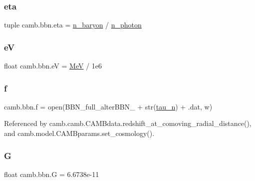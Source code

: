 \mbox{\label{namespacecamb_1_1bbn_acbc137606c793f20e1ded220bbfab367}} 
\subsubsection{\texorpdfstring{eta}{eta}}
{\footnotesize\ttfamily tuple camb.\+bbn.\+eta = \mbox{\hyperlink{namespacecamb_1_1bbn_a6c667fa779cc99916a01199319f7757f}{n\+\_\+baryon}} / \mbox{\hyperlink{namespacecamb_1_1bbn_aa1b409ea1a7b5f583772b3f5cc174be0}{n\+\_\+photon}}}

\mbox{\label{namespacecamb_1_1bbn_adb3c70534be507b9680c975ad6c2ada1}} 
\subsubsection{\texorpdfstring{eV}{eV}}
{\footnotesize\ttfamily float camb.\+bbn.\+eV = \mbox{\hyperlink{namespacecamb_1_1bbn_ab7d9516327d53209dc68ed04b575b942}{MeV}} / 1e6}

\mbox{\label{namespacecamb_1_1bbn_afa8615e8e051ca1f43e59371e94d4920}} 
\subsubsection{\texorpdfstring{f}{f}}
{\footnotesize\ttfamily camb.\+bbn.\+f = open(\textquotesingle{}B\+B\+N\+\_\+full\+\_\+alter\+B\+B\+N\+\_\+\textquotesingle{} + str(\mbox{\hyperlink{namespacecamb_1_1bbn_ae95abe1177100ca3b8cfb59cf9e379be}{tau\+\_\+n}}) + \textquotesingle{}.dat\textquotesingle{}, \textquotesingle{}w\textquotesingle{})}



Referenced by camb.\+camb.\+C\+A\+M\+Bdata.\+redshift\+\_\+at\+\_\+comoving\+\_\+radial\+\_\+distance(), and camb.\+model.\+C\+A\+M\+Bparams.\+set\+\_\+cosmology().

\mbox{\label{namespacecamb_1_1bbn_a516a8888d6d387c64db5a92882e60839}} 
\subsubsection{\texorpdfstring{G}{G}}
{\footnotesize\ttfamily float camb.\+bbn.\+G = 6.\+6738e-\/11}

